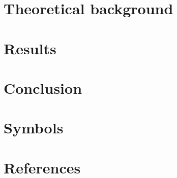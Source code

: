 \documentclass[we,twoside,openright,a4paper,11pt]{uantwerpenbamathesis}
\begin{document}
\chapter{Theoretical background}

\chapter{Results}

\chapter{Conclusion}

\appendix

\chapter{Symbols}
\chapter{References}
\end{document}
